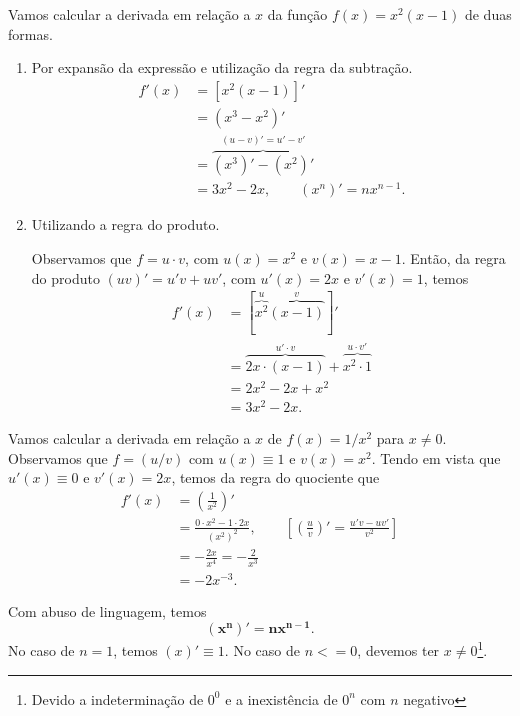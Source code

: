 \begin{ex}
  Vamos calcular a derivada em relação a $x$ da função $f(x) = x^2(x-1)$ de duas formas.
  \begin{enumerate}[1.]
  \item Por expansão da expressão e utilização da regra da subtração.
    \begin{align}
      f'(x) &= [x^2(x-1)]'\\
            &= (x^3-x^2)' \\
            &= \overbrace{(x^3)'-(x^2)'}^{(u-v)'=u'-v'}\\
            &= 3x^2-2x,\quad\quad(x^n)' = nx^{n-1}.
    \end{align}
  \item Utilizando a regra do produto.

    Observamos que $f = u\cdot v$, com $u(x) = x^2$ e $v(x) = x-1$. Então, da regra do produto $(uv)' = u'v + uv'$, com $u'(x) = 2x$ e $v'(x) = 1$, temos
    \begin{align}
      f'(x) &= [\overbrace{x^2}^{u}\overbrace{(x-1)}^{v}]'\\
            &= \overbrace{2x\cdot (x-1)}^{u'\cdot v} + \overbrace{x^2\cdot 1}^{u\cdot v'}\\
            &= 2x^2 - 2x + x^2\\
            &= 3x^2 - 2x.
    \end{align}
  \end{enumerate}
\end{ex}

\begin{ex}\label{ex:deriv_x-2}
  Vamos calcular a derivada em relação a $x$ de $f(x) = 1/x^2$ para $x\neq 0$. Observamos que $f = (u/v)$ com $u(x) \equiv 1$ e $v(x) = x^2$. Tendo em vista que $u'(x) \equiv 0$ e $v'(x) = 2x$, temos da regra do quociente que
  \begin{align}
    f'(x) &= \left(\frac{1}{x^2}\right)' \\
          &= \frac{0\cdot x^2 - 1\cdot 2x}{(x^2)^2},\quad\quad\left[\left(\frac{u}{v}\right)' = \frac{u'v-uv'}{v^2}\right]\\
          &= -\frac{2x}{x^4} = -\frac{2}{x^3}\\
          &= -2x^{-3}.
  \end{align}
\end{ex}

\begin{obs}
  Com abuso de linguagem, temos
  \begin{equation}
    \pmb{(x^n)' = nx^{n-1}}.
  \end{equation}
  No caso de $n=1$, temos $(x)' \equiv 1$. No caso de $n <= 0$, devemos ter $x\neq 0$\footnote{Devido a indeterminação de $0^0$ e a inexistência de $0^n$ com $n$ negativo}.
\end{obs}

